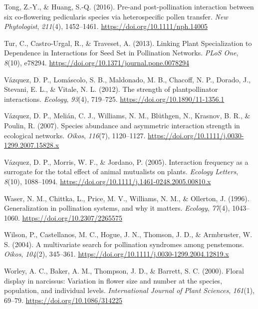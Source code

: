 \documentclass[
  12pt,
  a4paper,
]{article}
\newlength{\cslhangindent}
\newlength{\cslentryspacingunit} %
\newenvironment{CSLReferences}[2] %
 {%
  \setlength{\parindent}{0pt}
  \ifodd #1
  \let\oldpar\par
  \def\par{\hangindent=\cslhangindent\oldpar}
  \fi
  \setlength{\parskip}{#2\cslentryspacingunit}
 }%
 {}
\begin{document}
\begin{CSLReferences}{1}{0}
\leavevmode{}%
Tong, Z.-Y., \& Huang, S.-Q. (2016). Pre-and post-pollination interaction between six co-flowering pedicularis species via heterospecific pollen transfer. \emph{New Phytologist}, \emph{211}(4), 1452--1461. \url{https://doi.org/10.1111/nph.14005}

\leavevmode{}%
Tur, C., Castro-Urgal, R., \& Traveset, A. (2013). Linking {Plant Specialization} to {Dependence} in {Interactions} for {Seed Set} in {Pollination Networks}. \emph{PLoS One}, \emph{8}(10), e78294. \url{https://doi.org/10.1371/journal.pone.0078294}

\leavevmode{}%
Vázquez, D. P., Lomáscolo, S. B., Maldonado, M. B., Chacoff, N. P., Dorado, J., Stevani, E. L., \& Vitale, N. L. (2012). The strength of plant\textendash pollinator interactions. \emph{Ecology}, \emph{93}(4), 719--725. \url{https://doi.org/10.1890/11-1356.1}

\leavevmode{}%
Vázquez, D. P., Melián, C. J., Williams, N. M., Blüthgen, N., Krasnov, B. R., \& Poulin, R. (2007). Species abundance and asymmetric interaction strength in ecological networks. \emph{Oikos}, \emph{116}(7), 1120--1127. \url{https://doi.org/10.1111/j.0030-1299.2007.15828.x}

\leavevmode{}%
Vázquez, D. P., Morris, W. F., \& Jordano, P. (2005). Interaction frequency as a surrogate for the total effect of animal mutualists on plants. \emph{Ecology Letters}, \emph{8}(10), 1088--1094. \url{https://doi.org/10.1111/j.1461-0248.2005.00810.x}

\leavevmode{}%
Waser, N. M., Chittka, L., Price, M. V., Williams, N. M., \& Ollerton, J. (1996). Generalization in pollination systems, and why it matters. \emph{Ecology}, \emph{77}(4), 1043--1060. \url{https://doi.org/10.2307/2265575}

\leavevmode{}%
Wilson, P., Castellanos, M. C., Hogue, J. N., Thomson, J. D., \& Armbruster, W. S. (2004). A multivariate search for pollination syndromes among penstemons. \emph{Oikos}, \emph{104}(2), 345--361. \url{https://doi.org/10.1111/j.0030-1299.2004.12819.x}

\leavevmode{}%
Worley, A. C., Baker, A. M., Thompson, J. D., \& Barrett, S. C. (2000). Floral display in narcissus: Variation in flower size and number at the species, population, and individual levels. \emph{International Journal of Plant Sciences}, \emph{161}(1), 69--79. \url{https://doi.org/10.1086/314225}


\end{CSLReferences}
\end{document}
